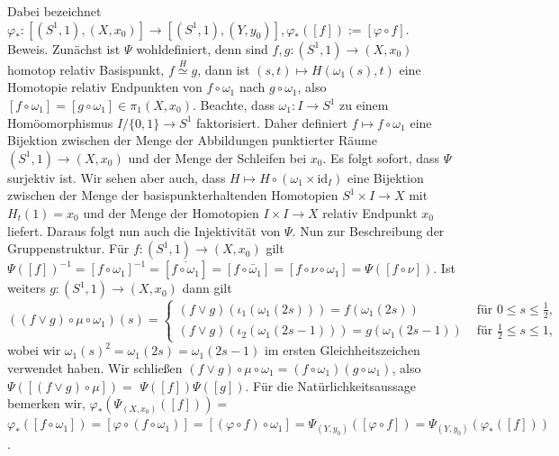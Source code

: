 \documentclass[10pt]{article}
\begin{document}
Dabei bezeichnet $\varphi_{*}:\left[\left(S^{1}, 1\right),\left(X, x_{0}\right)\right] \rightarrow\left[\left(S^{1}, 1\right),\left(Y, y_{0}\right)\right], \varphi_{*}([f]):=[\varphi \circ f]$.\\
Beweis. Zunächst ist $\Psi$ wohldefiniert, denn sind $f, g:\left(S^{1}, 1\right) \rightarrow\left(X, x_{0}\right)$ homotop relativ Basispunkt, $f \stackrel{H}{\simeq} g$, dann ist $(s, t) \mapsto H\left(\omega_{1}(s), t\right)$ eine Homotopie relativ Endpunkten von $f \circ \omega_{1}$ nach $g \circ \omega_{1}$, also $\left[f \circ \omega_{1}\right]=\left[g \circ \omega_{1}\right] \in \pi_{1}\left(X, x_{0}\right)$. Beachte, dass $\omega_{1}: I \rightarrow S^{1}$ zu einem Homöomorphismus $I /\{0,1\} \rightarrow S^{1}$ faktorisiert. Daher definiert $f \mapsto f \circ \omega_{1}$ eine Bijektion zwischen der Menge der Abbildungen punktierter Räume $\left(S^{1}, 1\right) \rightarrow\left(X, x_{0}\right)$ und der Menge der Schleifen bei $x_{0}$. Es folgt sofort, dass $\Psi$ surjektiv ist. Wir sehen aber auch, dass $H \mapsto H \circ\left(\omega_{1} \times \mathrm{id}_{I}\right)$ eine Bijektion zwischen der Menge der basispunkterhaltenden Homotopien $S^{1} \times I \rightarrow X$ mit $H_{t}(1)=x_{0}$ und der Menge der Homotopien $I \times I \rightarrow X$ relativ Endpunkt $x_{0}$ liefert. Daraus folgt nun auch die Injektivität von $\Psi$. Nun zur Beschreibung der Gruppenstruktur. Für $f:\left(S^{1}, 1\right) \rightarrow\left(X, x_{0}\right)$ gilt $\Psi([f])^{-1}=\left[f \circ \omega_{1}\right]^{-1}=\left[\overline{f \circ \omega_{1}}\right]=\left[f \circ \bar{\omega}_{1}\right]=\left[f \circ \nu \circ \omega_{1}\right]=\Psi([f \circ \nu])$. Ist weiters $g:\left(S^{1}, 1\right) \rightarrow\left(X, x_{0}\right)$ dann gilt\\
$\left((f \vee g) \circ \mu \circ \omega_{1}\right)(s)= \begin{cases}(f \vee g)\left(\iota_{1}\left(\omega_{1}(2 s)\right)\right)=f\left(\omega_{1}(2 s)\right) & \text { für } 0 \leq s \leq \frac{1}{2}, \\ (f \vee g)\left(\iota_{2}\left(\omega_{1}(2 s-1)\right)\right)=g\left(\omega_{1}(2 s-1)\right) & \text { für } \frac{1}{2} \leq s \leq 1,\end{cases}$\\
wobei wir $\omega_{1}(s)^{2}=\omega_{1}(2 s)=\omega_{1}(2 s-1)$ im ersten Gleichheitszeichen verwendet haben. Wir schließen $(f \vee g) \circ \mu \circ \omega_{1}=\left(f \circ \omega_{1}\right)\left(g \circ \omega_{1}\right)$, also $\Psi([(f \vee g) \circ \mu])=$ $\Psi([f]) \Psi([g])$. Für die Natürlichkeitsaussage bemerken wir, $\varphi_{*}\left(\Psi_{\left(X, x_{0}\right)}([f])\right)=$ $\varphi_{*}\left(\left[f \circ \omega_{1}\right]\right)=\left[\varphi \circ\left(f \circ \omega_{1}\right)\right]=\left[(\varphi \circ f) \circ \omega_{1}\right]=\Psi_{\left(Y, y_{0}\right)}([\varphi \circ f])=\Psi_{\left(Y, y_{0}\right)}\left(\varphi_{*}([f])\right)$.
\end{document}
